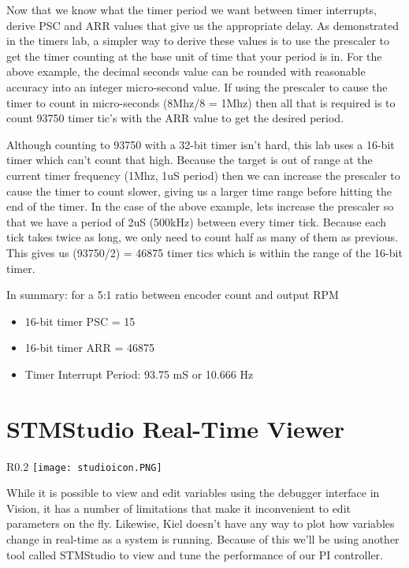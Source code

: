 \documentclass[11pt,fleqn]{book} %
\begin{document}
Now that we know what the timer period we want between timer interrupts, derive PSC and ARR values that give us the appropriate delay. As demonstrated in the timers lab, a simpler way to derive these values is to use the prescaler to get the timer counting at the base unit of time that your period is in. For the above example, the decimal seconds value can be rounded with reasonable accuracy into an integer micro-second value. If using the prescaler to cause the timer to count in micro-seconds (8Mhz/8 = 1Mhz) then all that is required is to count 93750 timer tic's with the ARR value to get the desired period. 

Although counting to 93750 with a 32-bit timer isn't hard, this lab uses a 16-bit timer which can't count that high. Because the target is out of range at the current timer frequency (1Mhz, 1uS period) then we can increase the prescaler to cause the timer to count slower, giving us a larger time range before hitting the end of the timer. In the case of the above example, lets increase the prescaler so that we have a period of 2uS (500kHz) between every timer tick. Because each tick takes twice as long, we only need to count half as many of them as previous. This gives us (93750/2) = 46875 timer tics which is within the range of the 16-bit timer.

In summary: for a 5:1 ratio between encoder count and output RPM
\begin{itemize}
    \item 16-bit timer PSC = 15 
    \item 16-bit timer ARR = 46875
    \item Timer Interrupt Period: 93.75 mS or 10.666 Hz
\end{itemize}


\section{STMStudio Real-Time Viewer}

\begin{wrapfigure}{R}{0.2\textwidth}
    \centering\texttt{[image: studioicon.PNG]}
\end{wrapfigure}

While it is possible to view and edit variables using the debugger interface in {\textmu}Vision, it has a number of limitations that make it inconvenient to edit parameters on the fly. Likewise, Kiel doesn't have any way to plot how variables change in real-time as a system is running. Because of this we'll be using another tool called STMStudio to view and tune the performance of our PI controller. 
\end{document}
